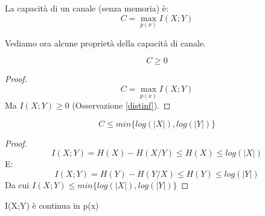 \begin{definizione}
 La capacità di un canale (senza memoria) è:
 \[
  C=\max_{p(x)} I(X;Y)
 \]

\end{definizione}

\bigskip

\noindent
Vediamo ora alcune proprietà della capacità di canale.

\begin{osservazione}
\[
 C \ge 0
\]
 \begin{proof}
  \[
   C=\max_{p(x)} I(X;Y)
  \]
  Ma $I(X;Y) \ge 0$ (Osservazione \ref{distinf}).
 \end{proof}
\end{osservazione}

\bigskip

\begin{osservazione}
\[
 C \le min\{log(|X|), log(|Y|)\}
\]
 \begin{proof}
  \[
   I(X;Y)=H(X)-H(X/Y) \le H(X) \le log(|X|)
  \]
  E:
  \[
   I(X;Y)=H(Y)-H(Y/X) \le H(Y) \le log(|Y|)
  \]
  Da cui $I(X;Y) \le min\{log(|X|), log(|Y|)\}$
 \end{proof}
\end{osservazione}

\bigskip

\begin{osservazione}
\mbox{}

 I(X;Y) è continua in p(x)
\end{osservazione}

